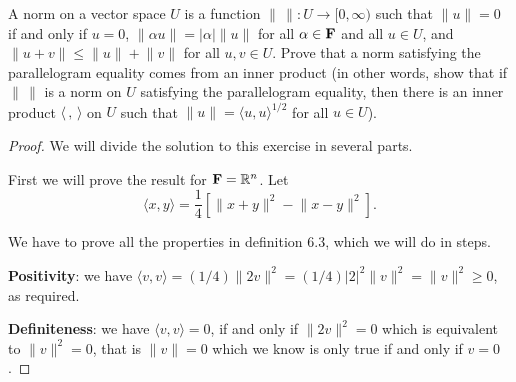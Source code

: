 \begin{exercise}{21}
  A norm on a vector space $U$ is a function $\lVert\,\rVert:U\to[0,\infty)$ such that $\lVert u\rVert=0$ if and only if $u=0$, $\lVert\alpha u\rVert= \lvert\alpha \rvert\lVert u\rVert$ for all $\alpha\in\mathbf{F}$ and all $u\in U$, and $\lVert u+v\rVert\leq \lVert u\rVert +\lVert v\rVert$ for all $u,v\in U$. Prove that a norm satisfying the parallelogram equality comes from an inner product (in other words, show that if $\lVert\,\rVert$ is a norm on $U$ satisfying the parallelogram equality, then there is an inner product $\langle\, ,\,\rangle$ on $U$ such that $\lVert u\rVert=\langle u,u\rangle^{1/2}$ for all $u\in U$).
\end{exercise}
\begin{proof}
 We will divide the solution to this exercise in several parts.

 First we will prove the result for $\mathbf{F}=\mathbb{R}^n$. Let 
 \[ \langle x,y\rangle =\frac{1}{4}[\lVert x+y\rVert^2- \lVert x-y\rVert^2]. \]

 We have to prove all the properties in definition 6.3, which we will do in steps.

 \textbf{Positivity}: we have $\langle v,v\rangle = (1/4)\lVert 2v\rVert^2= (1/4)\lvert 2\rvert^2\lVert v\rVert^2= \lVert v\rVert^2\geq 0$, as required.

 \textbf{Definiteness}: we have $\langle v,v\rangle=0$, if and only if $\lVert 2v\rVert^2=0$ which is equivalent to $\lVert v\rVert^2=0$, that is $\lVert v\rVert =0$ which we know is only true if and only if $v=0$.


\end{proof}
